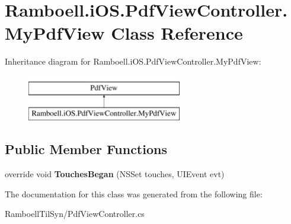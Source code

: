 \hypertarget{class_ramboell_1_1i_o_s_1_1_pdf_view_controller_1_1_my_pdf_view}{}\section{Ramboell.\+i\+O\+S.\+Pdf\+View\+Controller.\+My\+Pdf\+View Class Reference}
\label{class_ramboell_1_1i_o_s_1_1_pdf_view_controller_1_1_my_pdf_view}
Inheritance diagram for Ramboell.\+i\+O\+S.\+Pdf\+View\+Controller.\+My\+Pdf\+View\+:\begin{figure}[H]
\begin{center}
\leavevmode
\includegraphics[height=2.000000cm]{class_ramboell_1_1i_o_s_1_1_pdf_view_controller_1_1_my_pdf_view}
\end{center}
\end{figure}
\subsection*{Public Member Functions}
\begin{DoxyCompactItemize}
\item 
\mbox{\label{class_ramboell_1_1i_o_s_1_1_pdf_view_controller_1_1_my_pdf_view_acca020cad65fb98eebc091a49e4c6593}} 
override void {\bfseries Touches\+Began} (N\+S\+Set touches, U\+I\+Event evt)
\end{DoxyCompactItemize}


The documentation for this class was generated from the following file\+:\begin{DoxyCompactItemize}
\item 
Ramboell\+Til\+Syn/Pdf\+View\+Controller.\+cs\end{DoxyCompactItemize}

